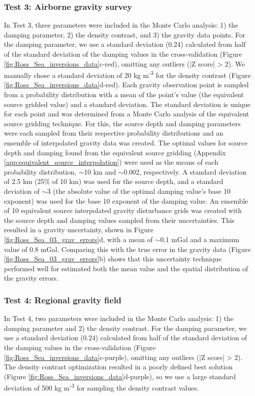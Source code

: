 \documentclass[tc, manuscript]{copernicus}
\begin{document}
\subsubsection{Test 3: Airborne gravity survey}
In Test 3, three parameters were included in the Monte Carlo analysis: 1) the damping parameter, 2) the density contrast, and 3) the gravity data points. For the damping parameter, we use a standard deviation (0.24) calculated from half of the standard deviation of the damping values in the cross-validation (Figure \ref{fig:Ross_Sea_inversions_data}c-red), omitting any outliers (|Z score| > 2). We manually chose a standard deviation of 20 kg m\textsuperscript{-3} for the density contrast (Figure \ref{fig:Ross_Sea_inversions_data}d-red). Each gravity observation point is sampled from a probability distribution with a mean of the point's value (the equivalent source gridded value) and a standard deviation. The standard deviation is unique for each point and was determined from a Monte Carlo analysis of the equivalent source gridding technique. For this, the source depth and damping parameters were each sampled from their respective probability distributions and an ensemble of interpolated gravity data was created. The optimal values for source depth and damping found from the equivalent source gridding (Appendix \ref{app:equivalent_source_interpolation}) were used as the means of each probability distribution, $\sim$10 km and $\sim$0.002, respectively. A standard deviation of 2.5 km (25\% of 10 km) was used for the source depth, and a standard deviation of $\sim$3 (the absolute value of the optimal damping value's base 10 exponent) was used for the base 10 exponent of the damping value. An ensemble of 10 equivalent source interpolated gravity disturbance grids was created with the source depth and damping values sampled from their uncertainties. This resulted in a gravity uncertainty, shown in Figure \ref{fig:Ross_Sea_03_grav_errors}d, with a mean of $\sim$0.1 mGal and a maximum value of 0.8 mGal. Comparing this with the true error in the gravity data (Figure \ref{fig:Ross_Sea_03_grav_errors}b) shows that this uncertainty technique performed well for estimated both the mean value and the spatial distribution of the gravity errors.

\subsubsection{Test 4: Regional gravity field}
In Test 4, two parameters were included in the Monte Carlo analysis: 1) the damping parameter and 2) the density contrast. For the damping parameter, we use a standard deviation (0.24) calculated from half of the standard deviation of the damping values in the cross-validation (Figure \ref{fig:Ross_Sea_inversions_data}c-purple), omitting any outliers (|Z score| > 2). The density contrast optimization resulted in a poorly defined best solution (Figure \ref{fig:Ross_Sea_inversions_data}d-purple), so we use a large standard deviation of 500 kg m\textsuperscript{-3} for sampling the density contrast values.
\end{document}
